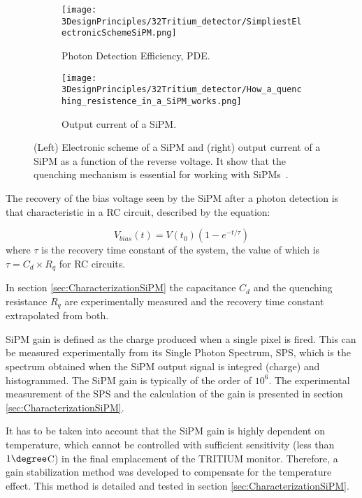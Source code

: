 \begin{figure}
\centering
    \begin{subfigure}[b]{0.45\textwidth}
    \centering
    \texttt{[image: 3DesignPrinciples/32Tritium\_detector/SimpliestElectronicSchemeSiPM.png]}  
    \caption{Photon Detection Efficiency, PDE.\label{subfig:ElectricModelSiPM}}
    \end{subfigure}
    \hfill
    \begin{subfigure}[b]{0.45\textwidth}
    \centering
    \texttt{[image: 3DesignPrinciples/32Tritium\_detector/How\_a\_quenching\_resistence\_in\_a\_SiPM\_works.png]}  
    \caption{Output current of a SiPM.\label{subfig:HowSiPMworks}}
    \end{subfigure}
 \caption{(Left) Electronic scheme of a SiPM and (right) output current of a SiPM as a function of the reverse voltage. It show that the quenching mechanism is essential for working with SiPMs~\cite{DataSheetSensL}.}
 \label{fig:ChenchingResistance}
\end{figure}

The recovery of the bias voltage seen by the SiPM after a photon detection is that characteristic in a RC circuit, described by the equation: 

\begin{equation}
V_{bias}(t)=V(t_0)\left(1-e^{-t/\tau} \right)
\label{RCCircuitBiasVoltage}
\end{equation}
where $\tau$ is the recovery time constant of the system, the value of which is $\tau=C_d \times R_q$ for RC circuits.

In section \ref{sec:CharacterizationSiPM} the capacitance $C_d$ and the quenching resistance $R_q$ are experimentally measured and the recovery time constant extrapolated from both.

SiPM gain is defined as the charge produced when a single pixel is fired. This can be measured experimentally from its Single Photon Spectrum, SPS, which is the spectrum obtained when the SiPM output signal is integred (charge) and histogrammed. The SiPM gain is typically of the order of $10^6$. The experimental measurement of the SPS and the calculation of the gain is presented in section \ref{sec:CharacterizationSiPM}.

It has to be taken into account that the SiPM gain is highly dependent on temperature, which cannot be controlled with sufficient sensitivity (less than $1\degree$C) in the final emplacement of the TRITIUM monitor. Therefore, a gain stabilization method was developed to compensate for the temperature effect. This method is detailed and tested in section \ref{sec:CharacterizationSiPM}.

